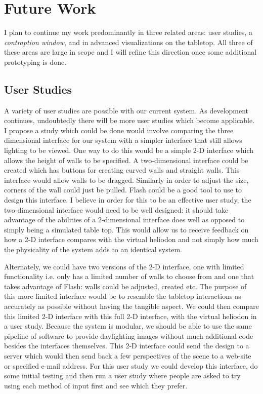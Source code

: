 \chapter{Future Work}


I plan to continue my work predominantly in three related areas: user studies, a \emph{contraption window}, and in advanced visualizations on the tabletop.  All three of these areas are large in scope and I will refine this direction once some additional prototyping is done.


\section{User Studies}
A variety of user studies are possible with our current system.  As development continues, undoubtedly there will be more user studies which become applicable.  I propose a study which could be done would involve comparing the three dimensional interface for our system with a simpler interface that still allows lighting to be viewed.  One way to do this would be a simple 2-D interface which allows the height of walls to be specified.  A two-dimensional interface could be created which has buttons for creating curved walls and straight walls.  This interface would allow walls to be dragged.  Similarly in order to adjust the size, corners of the wall could just be pulled.  Flash could be a good tool to use to design this interface.  I believe in order for this to be an effective user study, the two-dimensional interface would need to be well designed: it should take advantage of the abilities of a 2-dimensional interface does well as opposed to simply being a simulated table top.  This would allow us to receive feedback on how a 2-D interface compares with the virtual heliodon and not simply how much the physicality of the system adds to an identical system.  

Alternately, we could have two versions of the 2-D interface, one with limited functionality i.e. only has a limited number of walls to choose from and one that takes advantage of Flash: walls could be adjusted, created etc.  The purpose of this more limited interface would be to resemble the tabletop interactions as accurately as possible without having the tangible aspect.  We could then compare this limited 2-D interface with this full 2-D interface, with the virtual heliodon in a user study.  Because the system is modular, we should be able to use the same pipeline of software to provide daylighting images without much additional code besides the interfaces themselves.  This 2-D interface could send the design to a server which would then send back a few perspectives of the scene to a web-site or specified e-mail address.  For this user study we could develop this interface, do some initial testing and then run a user study where people are asked to try using each method of input first and see which they prefer.  

